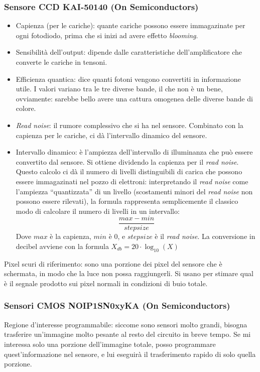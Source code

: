 \documentclass[a4paper,11pt]{article}
\begin{document}
\subsubsection{Sensore CCD KAI-50140 (On Semiconductors)}
\begin{itemize}
    \item Capienza (per le cariche): quante cariche possono essere immagazinate per ogni fotodiodo, prima
    che si inizi ad avere effetto \textit{blooming}.
    \item Sensibilità dell'output: dipende dalle caratteristiche dell'amplificatore che converte le cariche in tensoni.
    \item Efficienza quantica: dice quanti fotoni vengono convertiti in informazione utile.
    I valori variano tra le tre diverse bande, il che non è un bene, ovviamente: sarebbe bello avere una
    cattura omogenea delle diverse bande di colore.
    \item \textit{Read noise}: il rumore complessivo che si ha nel sensore. Combinato con la capienza per le cariche, ci dà
    l'intervallo dinamico del sensore.
    \item Intervallo dinamico: è l'ampiezza dell'intervallo di illuminanza che può essere convertito dal sensore.
    Si ottiene dividendo la capienza per il \textit{read noise}. Questo calcolo ci dà il numero di livelli distinguibili
    di carica che possono essere immagazinati nel pozzo di elettroni: interpretando il \textit{read noise} come
    l'ampiezza ``quantizzata'' di un livello (scostamenti minori del \textit{read noise} non possono essere rilevati),
    la formula rappresenta semplicemente il classico modo di calcolare il numero di livelli in un intervallo:
    \[\frac{max-min}{stepsize}\]
    Dove $max$ è la capienza, $min$ è 0, e $stepsize$ è il \textit{read noise}.
    La conversione in decibel avviene con la formula $X_{db} = 20 \cdot  \log_{10}(X)$
\end{itemize}
Pixel scuri di riferimento: sono una porzione dei pixel del sensore che è schermata, in modo che la luce non possa raggiungerli.
Si usano per stimare qual è il segnale prodotto sui pixel normali in condizioni di buio totale.

\subsubsection{Sensori CMOS NOIP1SN0xyKA (On Semiconductors)}
Regione d'interesse programmabile: siccome sono sensori molto grandi, bisogna trasferire un'immagine molto pesante
al resto del circuito in breve tempo. Se mi interessa solo una porzione dell'immagine totale,
posso programmare quest'informazione nel sensore, e lui eseguirà il trasferimento rapido di solo quella porzione.
\end{document}
